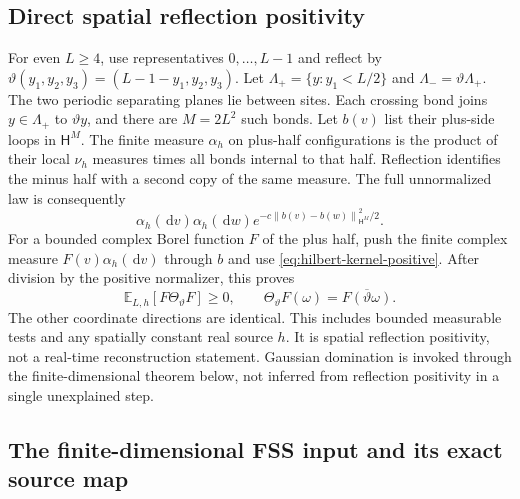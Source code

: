 \documentclass[11pt]{article}
\numberwithin{equation}{section}
\theoremstyle{definition}
\newcommand{\E}{\mathbb E}
\newcommand{\dd}{\,\mathrm d}
\newcommand{\norm}[1]{\left\lVert#1\right\rVert}
\begin{document}
\subsection{Direct spatial reflection positivity}
\label{sec:spatial-reflection}

For even $L\geq4$, use representatives $0,\ldots,L-1$ and reflect by
$\vartheta(y_1,y_2,y_3)=(L-1-y_1,y_2,y_3)$.
Let $\Lambda_+=\{y:y_1<L/2\}$ and $\Lambda_-=\vartheta\Lambda_+$.
The two periodic separating planes lie between sites.  Each crossing bond
joins $y\in\Lambda_+$ to $\vartheta y$, and there are $M=2L^2$ such
bonds.  Let $b(v)$ list their plus-side loops in $\mathsf H^M$.
The finite measure $\alpha_h$ on plus-half configurations is the product
of their local $\nu_h$ measures times all bonds internal to that half.
Reflection identifies the minus half with a second copy of the same measure.
The full unnormalized law is consequently
\[
 \alpha_h(\dd v)\alpha_h(\dd w)
                e^{-c\norm{b(v)-b(w)}_{\mathsf H^M}^2/2}.
\]
For a bounded complex Borel function $F$ of the plus half, push the finite
complex measure $F(v)\alpha_h(\dd v)$ through $b$ and use
\eqref{eq:hilbert-kernel-positive}.  After division by the positive
normalizer, this proves
\begin{equation}
 \E_{L,h}[F\Theta_{\vartheta}F]\geq0,\qquad
 \Theta_{\vartheta}F(\omega)=\overline{F(\vartheta\omega)}.
 \label{eq:spatial-reflection-positive}
\end{equation}
The other coordinate directions are identical.  This includes bounded
measurable tests and any spatially constant real source $h$.  It is spatial
reflection positivity, not a real-time reconstruction statement.  Gaussian
domination is invoked through the finite-dimensional theorem below, not
inferred from reflection positivity in a single unexplained step.

\subsection{The finite-dimensional FSS input and its exact source map}
\label{sec:fss-crosswalk}
\end{document}
